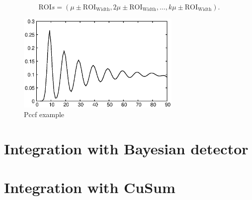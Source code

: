 \begin{equation}\label{eq:rois}
	\text{ROI}s = (\mu \pm \text{ROI}_{\text{Width}}, 2 \mu \pm \text{ROI}_{\text{Width}}, \dots , k \mu \pm \text{ROI}_{\text{Width}}).
\end{equation}
\begin{figure}[!htb]
	\centering
	\includegraphics[width=0.7\textwidth]{images/example_pccf.eps}
	\caption{Pccf example}\label{fig:pccf_example}
\end{figure}


\section{Integration with Bayesian detector}
\section{Integration with CuSum}
